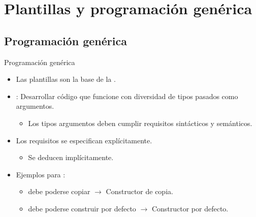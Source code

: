 \section{Plantillas y programación genérica}

\subsection{Programación genérica}

\begin{frame}[t]{Programación genérica}
\begin{itemize}
  \item Las plantillas son la base de la .
  \item {}: Desarrollar código que funcione
        con diversidad de tipos pasados como argumentos.
    \begin{itemize}
      \item Los tipos argumentos deben cumplir requisitos sintácticos y
            semánticos.
    \end{itemize}
  \item Los requisitos  se especifican explícitamente.
    \begin{itemize}
      \item Se deducen implícitamente.
    \end{itemize}
  \item Ejemplos para :
    \begin{itemize}
      \item {} debe poderse copiar $\rightarrow$ Constructor de copia.
      \item {} debe poderse construir por defecto $\rightarrow$ Constructor por defecto.
    \end{itemize}
\end{itemize}
\end{frame}

